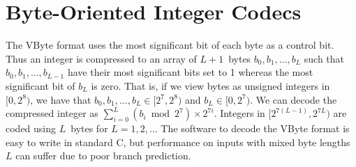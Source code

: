 \documentclass[compress]{elsarticle}
\newcommand{\vbyte}{VByte}
\begin{document}
%
%
%







\section{Byte-Oriented Integer Codecs}




The  \vbyte{} format uses the most significant bit of each
byte as a control bit.
Thus an integer is compressed to an array of $L+1$~bytes
 $b_0, b_1, \ldots, b_L $ such that
$b_0, b_1, \ldots, b_{L-1}$ have their most significant bits set
to 1 whereas the most significant bit of $b_L$ is zero.
That is, if we view bytes as unsigned integers in $[0,2^8)$, we have
that $b_0, b_1, \ldots, b_L \in [2^7, 2^8)$ and $b_L\in [0,2^7)$.
 We can decode the compressed integer as  $\sum_{i=0}^L (b_i \bmod 2^7) \times 2^{7 i}$.
 Integers in  $[2^{7(L-1)},2^{7L})$ are coded using  $L$~bytes for $L=1,2,\ldots$
The software to decode the \vbyte{} format is easy to write in standard C, but performance on inputs with mixed byte lengths $L$ can suffer due to poor branch prediction.
\end{document}
